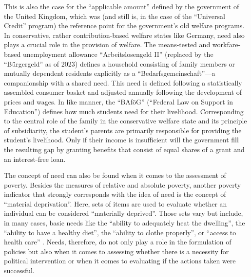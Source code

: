 \documentclass[12pt]{scrartcl}
\begin{document}
This is also the case for the ``applicable amount'' defined by the government of the United Kingdom, which was (and still is, in the case of the ``Universal Credit'' program) the reference point for the government's old welfare programs.
In conservative, rather contribution-based welfare states like Germany, need also plays a crucial role in the provision of welfare.
The means-tested and workfare-based unemployment allowance ``Arbeitslosengeld II'' (replaced by the ``B{\"u}rgergeld'' as of 2023) defines a household consisting of family members or mutually dependent residents explicitly as a ``Bedarfs\-gemeinschaft''---a companionship with a shared need.
This need is defined following a statistically assembled consumer basket and adjusted annually following the development of prices and wages.
In like manner, the ``BAf{\"o}G'' (``Federal Law on Support in Education'') defines how much students need for their livelihood.
Corresponding to the central role of the family in the conservative welfare state and its principle of subsidiarity, the student's parents are primarily responsible for providing the student's livelihood.
Only if their income is insufficient will the government fill the resulting gap by granting benefits that consist of equal shares of a grant and an interest-free loan.

The concept of need can also be found when it comes to the assessment of poverty.
Besides the measures of relative and absolute poverty, another poverty indicator that strongly corresponds with the idea of need is the concept of ``material deprivation''.
Here, sets of items are used to evaluate whether an individual can be considered ``materially deprived''.
Those sets vary but include, in many cases, basic needs like the ``ability to adequately heat the dwelling'', the ``ability to have a healthy diet'', the ``ability to clothe properly'', or ``access to health care'' \citep[p.~37]{boarini_measures_2006}.
Needs, therefore, do not only play a role in the formulation of policies but also when it comes to assessing whether there is a necessity for political intervention or when it comes to evaluating if the actions taken were successful.
\end{document}
